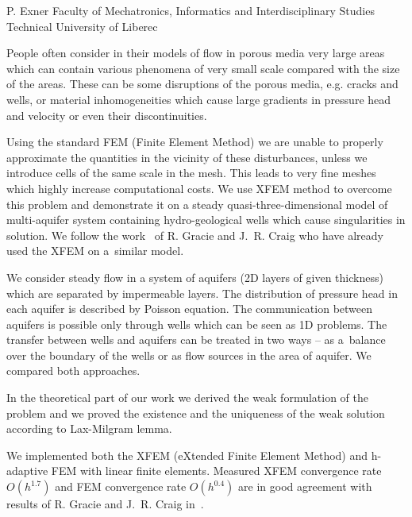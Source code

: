 \documentclass{sna}
\begin{document}
     {P. Exner}
     {Faculty of Mechatronics, Informatics and Interdisciplinary Studies \\ Technical University of Liberec}


People often consider in their models of flow in porous media very large areas which can contain various phenomena of very small scale
compared with the size of the areas. These can be some disruptions of the porous media, e.g. cracks and wells, or material inhomogeneities
which cause large gradients in pressure head and velocity or even their discontinuities.

Using the standard FEM (Finite Element Method) we are unable to properly approximate the quantities in the vicinity of these 
disturbances, unless we introduce cells of the same scale in the mesh. This leads to very fine meshes which highly increase computational costs.
We use XFEM method to overcome this problem and demonstrate it on a steady quasi-three-dimensional model of multi-aquifer system containing 
hydro-geological wells which cause singularities in solution. We follow the work~\cite{gracie} of R. Gracie and J.~R. Craig who have already used the XFEM on a~similar model.

We consider steady flow in a system of aquifers (2D layers of given thickness) which are separated by impermeable layers. The distribution of pressure head in each aquifer is described
by Poisson equation. The communication between aquifers is possible only through wells which can be seen as 1D problems. The transfer between wells and aquifers can be treated in two ways --
as a~balance over the boundary of the wells or as flow sources in the area of aquifer. We compared both approaches.


In the theoretical part of our work we derived the weak formulation of the problem and we proved the existence and the uniqueness 
of the weak solution according to Lax-Milgram lemma.

We implemented both the XFEM (eXtended Finite Element Method) and h-adaptive FEM with linear finite elements.
Measured XFEM convergence rate $O(h^{1.7})$ and FEM convergence rate $O(h^{0.4})$ are in good agreement with results of R. Gracie and J.~R. Craig in~\cite{gracie}.
\end{document}
